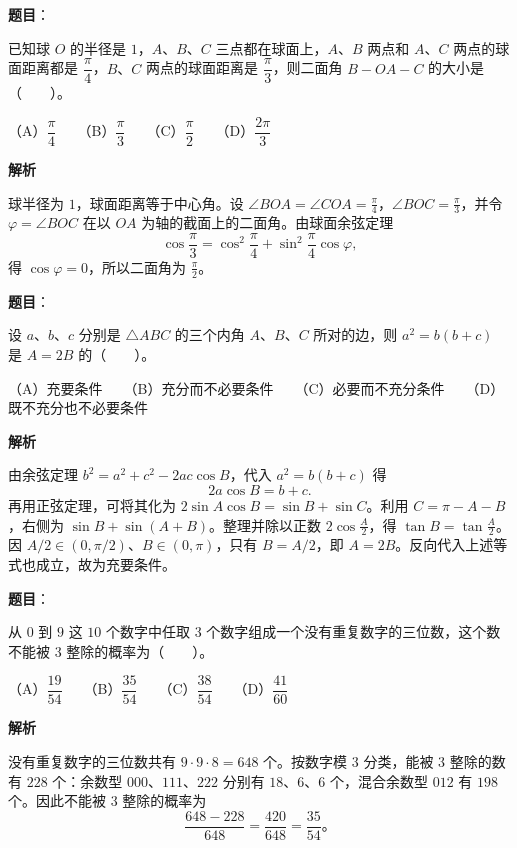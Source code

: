\begin{answer}

\textbf{题目}：

已知球 $O$ 的半径是 $1$，$A\text{、}B\text{、}C$ 三点都在球面上，$A\text{、}B$ 两点和 $A\text{、}C$ 两点的球面距离都是 $\dfrac\pi4$，$B\text{、}C$ 两点的球面距离是 $\dfrac\pi3$，则二面角 $B-OA-C$ 的大小是\mbox{（　　）}。

（A）$\dfrac\pi4$　　（B）$\dfrac\pi3$　　（C）$\dfrac\pi2$　　（D）$\dfrac{2\pi}3$

\textbf{解析}

球半径为 $1$，球面距离等于中心角。设 $\angle BOA=\angle COA=\frac\pi4$，$\angle BOC=\frac\pi3$，并令 $\varphi=\angle BOC$ 在以 $OA$ 为轴的截面上的二面角。由球面余弦定理
\nopagebreak[4]
\[
\cos\frac\pi3=\cos^2\frac\pi4+\sin^2\frac\pi4\cos\varphi,
\]
得 $\cos\varphi=0$，所以二面角为 $\frac\pi2$。


\end{answer}
\begin{answer}

\textbf{题目}：

设 $a\text{、}b\text{、}c$ 分别是 $\triangle ABC$ 的三个内角 $A\text{、}B\text{、}C$ 所对的边，则 $a^2=b(b+c)$ 是 $A=2B$ 的\mbox{（　　）}。

（A）充要条件　　（B）充分而不必要条件　　（C）必要而不充分条件　　（D）既不充分也不必要条件

\textbf{解析}

由余弦定理 $b^2=a^2+c^2-2ac\cos B$，代入 $a^2=b(b+c)$ 得
\nopagebreak[4]
\[
2a\cos B=b+c.
\]
再用正弦定理，可将其化为 $2\sin A\cos B=\sin B+\sin C$。利用 $C=\pi-A-B$，右侧为 $\sin B+\sin(A+B)$。整理并除以正数 $2\cos\frac A2$，得 $\tan B=\tan\frac A2$。因 $A/2\in(0,\pi/2)$、$B\in(0,\pi)$，只有 $B=A/2$，即 $A=2B$。反向代入上述等式也成立，故为充要条件。


\end{answer}
\begin{answer}

\textbf{题目}：

从 $0$ 到 $9$ 这 $10$ 个数字中任取 $3$ 个数字组成一个没有重复数字的三位数，这个数不能被 $3$ 整除的概率为\mbox{（　　）}。

（A）$\dfrac{19}{54}$　　（B）$\dfrac{35}{54}$　　（C）$\dfrac{38}{54}$　　（D）$\dfrac{41}{60}$

\textbf{解析}

没有重复数字的三位数共有 $9\cdot9\cdot8=648$ 个。按数字模 $3$ 分类，能被 $3$ 整除的数有 $228$ 个：余数型 $000\text{、}111\text{、}222$ 分别有 $18\text{、}6\text{、}6$ 个，混合余数型 $012$ 有 $198$ 个。因此不能被 $3$ 整除的概率为
\nopagebreak[4]
\[
\frac{648-228}{648}=\frac{420}{648}=\frac{35}{54}\mbox{。}
\]


\end{answer}
